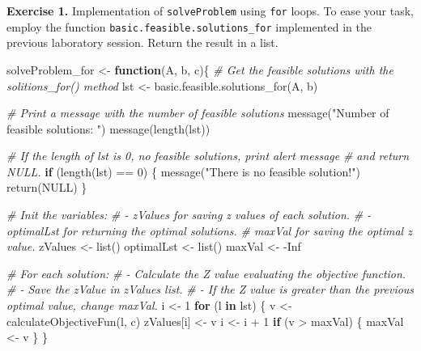 \documentclass[
]{article}
\newenvironment{Shaded}{\begin{snugshade}}{\end{snugshade}}
\newcommand{\CommentTok}[1]{\textcolor[rgb]{0.56,0.35,0.01}{\textit{#1}}}
\newcommand{\ConstantTok}[1]{\textcolor[rgb]{0.00,0.00,0.00}{#1}}
\newcommand{\ControlFlowTok}[1]{\textcolor[rgb]{0.13,0.29,0.53}{\textbf{#1}}}
\newcommand{\DecValTok}[1]{\textcolor[rgb]{0.00,0.00,0.81}{#1}}
\newcommand{\FunctionTok}[1]{\textcolor[rgb]{0.00,0.00,0.00}{#1}}
\newcommand{\NormalTok}[1]{#1}
\newcommand{\OtherTok}[1]{\textcolor[rgb]{0.56,0.35,0.01}{#1}}
\newcommand{\SpecialCharTok}[1]{\textcolor[rgb]{0.00,0.00,0.00}{#1}}
\newcommand{\StringTok}[1]{\textcolor[rgb]{0.31,0.60,0.02}{#1}}
\begin{document}
\textbf{Exercise 1.} Implementation of \texttt{solveProblem} using
\texttt{for} loops. To ease your task, employ the function
\texttt{basic.feasible.solutions\_for} implemented in the previous
laboratory session. Return the result in a list.

\begin{Shaded}
\begin{Highlighting}[]
\NormalTok{solveProblem\_for }\OtherTok{\textless{}{-}} \ControlFlowTok{function}\NormalTok{(A, b, c)\{}
  \CommentTok{\# Get the feasible solutions with the solitions\_for() method}
\NormalTok{  lst }\OtherTok{\textless{}{-}} \FunctionTok{basic.feasible.solutions\_for}\NormalTok{(A, b)}
  
  \CommentTok{\# Print a message with the number of feasible solutions}
  \FunctionTok{message}\NormalTok{(}\StringTok{"Number of feasible solutions: "}\NormalTok{)}
  \FunctionTok{message}\NormalTok{(}\FunctionTok{length}\NormalTok{(lst))}
  
  \CommentTok{\# If the length of lst is 0, no feasible solutions, print alert message}
  \CommentTok{\# and return NULL.}
  \ControlFlowTok{if}\NormalTok{ (}\FunctionTok{length}\NormalTok{(lst) }\SpecialCharTok{==} \DecValTok{0}\NormalTok{) \{}
    \FunctionTok{message}\NormalTok{(}\StringTok{"There is no feasible solution!"}\NormalTok{)}
    \FunctionTok{return}\NormalTok{(}\ConstantTok{NULL}\NormalTok{)}
\NormalTok{  \}}
  
  \CommentTok{\# Init the variables:}
  \CommentTok{\# {-} zValues for saving z values of each solution.}
  \CommentTok{\# {-} optimalLst for returning the optimal solutions.}
  \CommentTok{\# maxVal for saving the optimal z value.}
\NormalTok{  zValues }\OtherTok{\textless{}{-}} \FunctionTok{list}\NormalTok{()}
\NormalTok{  optimalLst }\OtherTok{\textless{}{-}} \FunctionTok{list}\NormalTok{()}
\NormalTok{  maxVal }\OtherTok{\textless{}{-}} \SpecialCharTok{{-}}\ConstantTok{Inf}
  
  \CommentTok{\# For each solution:}
  \CommentTok{\# {-} Calculate the Z value evaluating the objective function.}
  \CommentTok{\# {-} Save the zValue in zValues list.}
  \CommentTok{\# {-} If the Z value is greater than the previous optimal value, change maxVal.}
\NormalTok{  i }\OtherTok{\textless{}{-}} \DecValTok{1}
  \ControlFlowTok{for}\NormalTok{ (l }\ControlFlowTok{in}\NormalTok{ lst) \{}
\NormalTok{    v }\OtherTok{\textless{}{-}} \FunctionTok{calculateObjectiveFun}\NormalTok{(l, c)}
\NormalTok{    zValues[i] }\OtherTok{\textless{}{-}}\NormalTok{ v}
\NormalTok{    i }\OtherTok{\textless{}{-}}\NormalTok{ i }\SpecialCharTok{+} \DecValTok{1}
    \ControlFlowTok{if}\NormalTok{ (v }\SpecialCharTok{\textgreater{}}\NormalTok{ maxVal) \{}
\NormalTok{      maxVal }\OtherTok{\textless{}{-}}\NormalTok{ v}
\NormalTok{    \}}
\NormalTok{  \}}
  

\end{Highlighting}
\end{Shaded}
\end{document}
